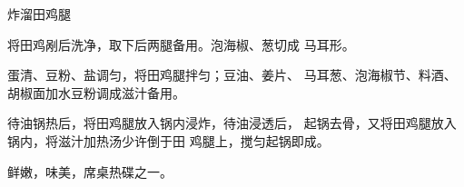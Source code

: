 \begin{recipe}{炸溜田鸡腿}

\ingredients


\cooking

\step 	将田鸡剐后洗净，取下后两腿备用。泡海椒、葱切成 马耳形。

\step 	蛋清、豆粉、盐调匀，将田鸡腿拌匀；豆油、姜片、 马耳葱、泡海椒节、料酒、胡椒面加水豆粉调成滋汁备用。

待油锅热后，将田鸡腿放入锅内浸炸，待油浸透后， 起锅去骨，又将田鸡腿放入锅内，将滋汁加热汤少许倒于田 鸡腿上，搅匀起锅即成。

\notes

鲜嫩，味美，席桌热碟之一。

\end{recipe}

